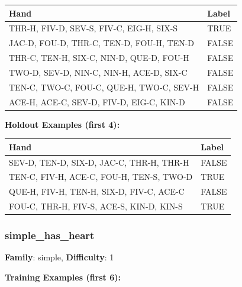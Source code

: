 \documentclass[10pt,a4paper]{article}
\begin{document}
\begin{small}
\begin{tabular}{p{8cm}l}
\toprule
Hand & Label \\
\midrule
THR-H, FIV-D, SEV-S, FIV-C, EIG-H, SIX-S & \textcolor{positive}{TRUE} \\
JAC-D, FOU-D, THR-C, TEN-D, FOU-H, TEN-D & \textcolor{negative}{FALSE} \\
THR-C, TEN-H, SIX-C, NIN-D, QUE-D, FOU-H & \textcolor{negative}{FALSE} \\
TWO-D, SEV-D, NIN-C, NIN-H, ACE-D, SIX-C & \textcolor{negative}{FALSE} \\
TEN-C, TWO-C, FOU-C, QUE-H, TWO-C, SEV-H & \textcolor{negative}{FALSE} \\
ACE-H, ACE-C, SEV-D, FIV-D, EIG-C, KIN-D & \textcolor{negative}{FALSE} \\
\bottomrule
\end{tabular}
\end{small}

\textbf{Holdout Examples (first 4):}

\begin{small}
\begin{tabular}{p{8cm}l}
\toprule
Hand & Label \\
\midrule
SEV-D, TEN-D, SIX-D, JAC-C, THR-H, THR-H & \textcolor{negative}{FALSE} \\
TEN-C, FIV-H, ACE-C, FOU-H, TEN-S, TWO-D & \textcolor{positive}{TRUE} \\
QUE-H, FIV-H, TEN-H, SIX-D, FIV-C, ACE-C & \textcolor{negative}{FALSE} \\
FOU-C, THR-H, FIV-S, ACE-S, KIN-D, KIN-S & \textcolor{positive}{TRUE} \\
\bottomrule
\end{tabular}
\end{small}

\vspace{0.5cm}

\subsubsection{simple\_has\_heart}

\textbf{Family}: simple, \textbf{Difficulty}: 1

\textbf{Training Examples (first 6):}
\end{document}
